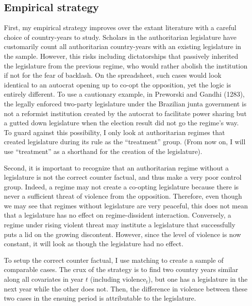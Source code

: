\subsection{Empirical strategy}

First, my empirical strategy improves over the extant literature with a careful choice of country-years to study. Scholars in the authoritarian legislature have customarily count all authoritarian country-years with an existing legislature in the sample. However, this risks including dictatorships that passively inherited the legislature from the previous regime, who would rather abolish the institution if not for the fear of backlash. On the spreadsheet, such cases would look identical to an autocrat opening up to co-opt the opposition, yet the logic is entirely different. To use a cautionary example, in Preworski and Gandhi (1283), the legally enforced two-party legislature under the Brazilian junta government is not a reformist institution created by the autocrat to facilitate power sharing but a gutted down legislature when the election result did not go the regime's way. To guard against this possibility, I only look at authoritarian regimes that created  legislature during its rule as the ``treatment'' group. (From now on, I will use ``treatment'' as a shorthand for the creation of the legislature).

Second, it is important to recognize that an authoritarian regime without a legislature is not the correct counter factual, and thus make a very poor control group. Indeed, a regime may not create a co-opting legislature because there is never a sufficient threat of violence from the opposition. Therefore, even though we may see that regimes without legislature are very peaceful, this does not mean that a legislature has no effect on regime-dissident interaction. Conversely, a regime under rising violent threat may institute a legislature that successfully puts a lid on the growing discontent. However, since the level of violence is now constant, it will look as though the legislature had no effect.

To setup the correct counter factual, I use matching to create a sample of comparable cases. The crux of the strategy is to find two country years similar along all covariates in year $t$ (including $\text{violence}_t$), but one has a legislature in the next year while the other does not. Then, the difference in violence between these two cases in the ensuing period is attributable to the legislature.

